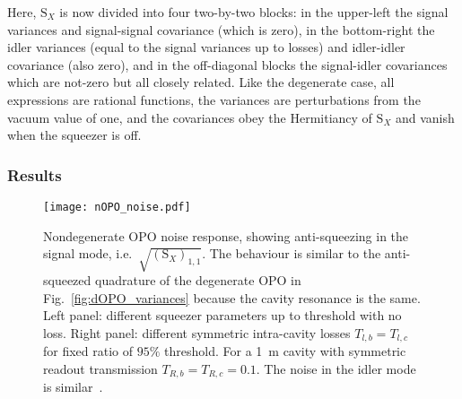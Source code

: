 Here, $\text{S}_X$ is now divided into four two-by-two blocks: in the upper-left the signal variances and signal-signal covariance (which is zero), in the bottom-right the idler variances (equal to the signal variances up to losses) and idler-idler covariance (also zero), and in the off-diagonal blocks the signal-idler covariances which are not-zero but all closely related. Like the degenerate case, all expressions are rational functions, the variances are perturbations from the vacuum value of one, and the covariances obey the Hermitiancy of $\text{S}_X$ and vanish when the squeezer is off. 

\subsubsection{Results} %
\label{sec:nOPO_results}

\begin{figure}
	\centering
	\texttt{[image: nOPO\_noise.pdf]}
	\caption{Nondegenerate OPO noise response, showing anti-squeezing in the signal mode, i.e.\ $\sqrt{(\text{S}_X)_{1,1}}$. The behaviour is similar to the anti-squeezed quadrature of the degenerate OPO in Fig.~\ref{fig:dOPO_variances} because the cavity resonance is the same. Left panel: different squeezer parameters up to threshold with no loss. Right panel: different symmetric intra-cavity losses $T_{l,b}=T_{l,c}$ for fixed ratio of $95\%$ threshold. For a 1~m cavity with symmetric readout transmission $T_{R,b}=T_{R,c}=0.1$. The noise in the idler mode is similar~\cite{}.}
	\label{fig:nOPO_variances}
\end{figure}

